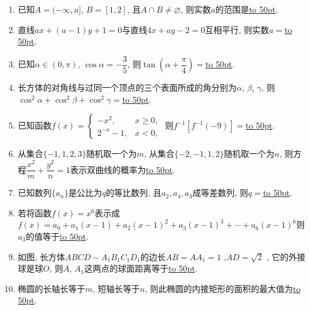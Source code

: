 \documentclass[10pt,a4paper]{article}
\newcommand{\blank}[1]{\underline{\hbox to #1pt{}}}
\begin{document}
\begin{enumerate}[1.]
\item 已知$A=(-\infty,a]$, $B=[1,2]$, 且$A\cap B\ne \varnothing$, 则实数$a$的范围是\blank{50}.
\item 直线$ax+(a-1)y+1=0$与直线$4x+ay-2=0$互相平行, 则实数$a=$\blank{50}.
\item 已知$\alpha \in (0,\pi)$, $\cos\alpha =-\dfrac35$, 则$\tan(\alpha+\dfrac{\pi}4)=$\blank{50}.
\item 长方体的对角线与过同一个顶点的三个表面所成的角分别为$\alpha$, $\beta$, $\gamma$, 则$\cos^2\alpha+\cos^2\beta+\cos^2\gamma =$\blank{50}.
\item 已知函数$f(x)=\begin{cases} -x^2, & x\ge 0,  \\2^{-x}-1, & x<0, \end{cases}$ 则$f^{-1}[f^{-1}(-9)]=$\blank{50}.
\item 从集合$\{-1,1,2,3\}$随机取一个为$m$, 从集合$\{-2,-1,1,2\}$随机取一个为$n$, 则方程$\dfrac{x^2}m+\dfrac{y^2}n=1$表示双曲线的概率为\blank{50}.  
\item 已知数列$\{a_n\}$是公比为$q$的等比数列, 且$a_2,a_4,a_3$成等差数列, 则$q=$\blank{50}.
\item 若将函数$f(x)=x^6$表示成$f(x)=a_0+a_1(x-1)+a_2(x-1)^2+a_3(x-1)^3+\cdots+a_6(x-1)^6$则$a_3$的值等于\blank{50}.
\item 如图, 长方体$ABCD-A_1B_1C_1D_1$的边长$AB=AA_1=1$ ,$AD=\sqrt2$ , 它的外接球是球$O$, 则$A$, $A_1$这两点的球面距离等于\blank{50}.
\begin{center}
\end{center}
\item 椭圆的长轴长等于$m$, 短轴长等于$n$, 则此椭圆的内接矩形的面积的最大值为\blank{50}. 



\end{enumerate}
\end{document}
